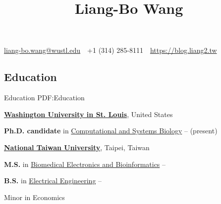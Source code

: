 \documentclass[a4paper,12pt,oneside]{article}
\begin{document}

\title{Liang-Bo Wang}

\begin{subtitle}
\href{mailto:liang-bo.wang@wustl.edu}
{liang-bo.wang@wustl.edu}
\,\BulletSymbol\,
+1 (314) 285-8111
\,\BulletSymbol\,
\href{https://blog.liang2.tw}
{https://blog.liang2.tw}
\end{subtitle}

\begin{body}


\section{Education}
{Education}
{PDF:Education}


\href{https://wustl.edu/}
{\textbf{Washington University in St. Louis}},
United States
\par
\textbf{Ph.D. candidate} in
\href{http://dbbs.wustl.edu/divprograms/compbio/Pages/default.aspx}
{Computational and Systems Biology}
\hfill
{} --
(present)

\BigEntryGap

\href{http://www.ntu.edu.tw/english/index.html}
{\textbf{National Taiwan University}},
Taipei, Taiwan
\par
\textbf{M.S.} in
\href{http://www.bebi.ntu.edu.tw/English/index.html}
{Biomedical Electronics and Bioinformatics}
\hfill
{} --


\EntryGapNoBreak
\textbf{B.S.} in
\href{http://www.ee.ntu.edu.tw/en/}
{Electrical Engineering}
\hfill
{} --
\par
Minor in Economics


\end{body}
\end{document}
